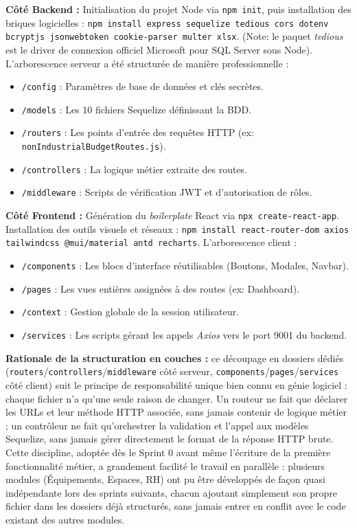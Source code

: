 \textbf{Côté Backend :}
Initialisation du projet Node via \texttt{npm init}, puis installation des briques logicielles :
\texttt{npm install express sequelize tedious cors dotenv bcryptjs jsonwebtoken cookie-parser multer xlsx}. 
(Note: le paquet \textit{tedious} est le driver de connexion officiel Microsoft pour SQL Server sous Node).
L'arborescence serveur a été structurée de manière professionnelle :
\begin{itemize}
    \item \texttt{/config} : Paramètres de base de données et clés secrètes.
    \item \texttt{/models} : Les 10 fichiers Sequelize définissant la BDD.
    \item \texttt{/routers} : Les points d'entrée des requêtes HTTP (ex: \texttt{nonIndustrialBudgetRoutes.js}).
    \item \texttt{/controllers} : La logique métier extraite des routes.
    \item \texttt{/middleware} : Scripts de vérification JWT et d'autorisation de rôles.
\end{itemize}

\textbf{Côté Frontend :}
Génération du \textit{boilerplate} React via \texttt{npx create-react-app}. Installation des outils visuels et réseaux :
\texttt{npm install react-router-dom axios tailwindcss @mui/material antd recharts}.
L'arborescence client :
\begin{itemize}
    \item \texttt{/components} : Les blocs d'interface réutilisables (Boutons, Modales, Navbar).
    \item \texttt{/pages} : Les vues entières assignées à des routes (ex: Dashboard).
    \item \texttt{/context} : Gestion globale de la session utilisateur.
    \item \texttt{/services} : Les scripts gérant les appels \textit{Axios} vers le port 9001 du backend.
\end{itemize}

\textbf{Rationale de la structuration en couches :} ce découpage en dossiers dédiés (\texttt{routers}/\texttt{controllers}/\texttt{middleware} côté serveur, \texttt{components}/\texttt{pages}/\texttt{services} côté client) suit le principe de responsabilité unique bien connu en génie logiciel : chaque fichier n'a qu'une seule raison de changer. Un routeur ne fait que déclarer les URLs et leur méthode HTTP associée, sans jamais contenir de logique métier ; un contrôleur ne fait qu'orchestrer la validation et l'appel aux modèles Sequelize, sans jamais gérer directement le format de la réponse HTTP brute. Cette discipline, adoptée dès le Sprint 0 avant même l'écriture de la première fonctionnalité métier, a grandement facilité le travail en parallèle : plusieurs modules (Équipements, Espaces, RH) ont pu être développés de façon quasi indépendante lors des sprints suivants, chacun ajoutant simplement son propre fichier dans les dossiers déjà structurés, sans jamais entrer en conflit avec le code existant des autres modules.


